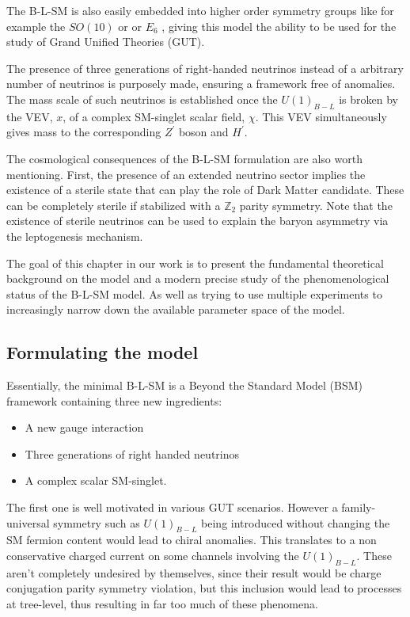 
The B-L-SM is also easily embedded into higher order symmetry groups like for example the $SO(10)$ or  or $E_6$ , giving this model the ability to be used for the study of Grand Unified Theories (GUT).  

The presence of three generations of right-handed neutrinos instead of a arbitrary number of neutrinos is purposely made, ensuring a framework free of anomalies. The mass scale of such neutrinos is established once the $U(1)_{B-L}$ is broken by the VEV, $x$, of a complex SM-singlet scalar field, $\chi$. This VEV simultaneously gives mass to the corresponding $Z^\prime$ boson and $H^\prime$.

The cosmological consequences of the B-L-SM formulation are also worth mentioning.  First, the presence of an extended neutrino sector implies the existence of a sterile state that can play the role of Dark Matter candidate. These can be completely sterile if stabilized with a $\mathbb{Z}_2$ parity symmetry. Note that the existence of sterile neutrinos can be used to explain the baryon asymmetry via the leptogenesis mechanism. 

The goal of this chapter in our work is to present the fundamental theoretical background on the model and a modern precise study of the phenomenological status of the B-L-SM model. As well as trying to use multiple experiments to increasingly narrow down the available parameter space of the model.  

\subsection{Formulating the model}

Essentially, the minimal B-L-SM is a Beyond the Standard Model (BSM) framework containing three new ingredients: 

\begin{itemize}
  \item A new gauge interaction
  \item Three generations of right handed neutrinos  
  \item A complex scalar SM-singlet.
\end{itemize}

The first one is well motivated in various GUT scenarios. However a family-universal symmetry such as $U(1)_{B-L}$ being introduced without changing the SM fermion content would lead to chiral anomalies. This translates to a non conservative charged current on some channels involving the $U(1)_{B-L}$. These aren't completely undesired by themselves, since their result would be charge conjugation parity symmetry violation, but this inclusion would lead to processes at tree-level, thus resulting in far too much of these phenomena.

